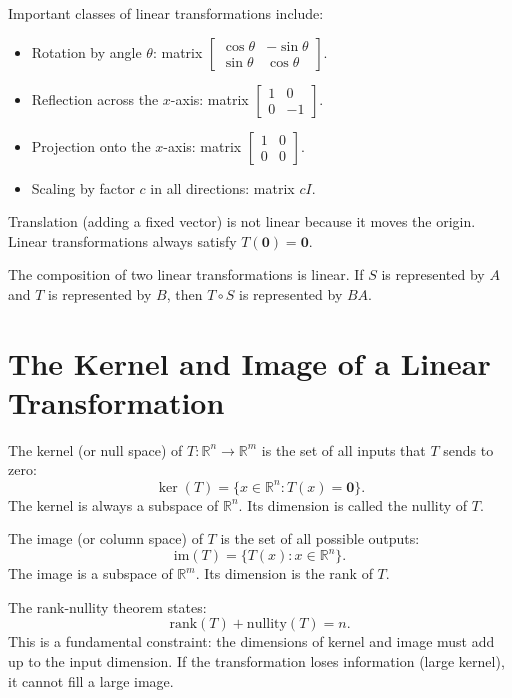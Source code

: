\documentclass[11pt]{article}
\begin{document}
Important classes of linear transformations include:
\begin{itemize}
  \item Rotation by angle $\theta$: matrix $\begin{bmatrix} \cos\theta & -\sin\theta \\ \sin\theta & \cos\theta \end{bmatrix}$.
  \item Reflection across the $x$-axis: matrix $\begin{bmatrix} 1 & 0 \\ 0 & -1 \end{bmatrix}$.
  \item Projection onto the $x$-axis: matrix $\begin{bmatrix} 1 & 0 \\ 0 & 0 \end{bmatrix}$.
  \item Scaling by factor $c$ in all directions: matrix $cI$.
\end{itemize}

Translation (adding a fixed vector) is not linear because it moves the origin. Linear transformations always satisfy $T(\mathbf{0}) = \mathbf{0}$.

The composition of two linear transformations is linear. If $S$ is represented by $A$ and $T$ is represented by $B$, then $T \circ S$ is represented by $BA$.

\section*{The Kernel and Image of a Linear Transformation}

The kernel (or null space) of $T: \mathbb{R}^n \to \mathbb{R}^m$ is the set of all inputs that $T$ sends to zero:
\[
\ker(T) = \{ x \in \mathbb{R}^n : T(x) = \mathbf{0} \}.
\]
The kernel is always a subspace of $\mathbb{R}^n$. Its dimension is called the nullity of $T$.

The image (or column space) of $T$ is the set of all possible outputs:
\[
\text{im}(T) = \{ T(x) : x \in \mathbb{R}^n \}.
\]
The image is a subspace of $\mathbb{R}^m$. Its dimension is the rank of $T$.

The rank-nullity theorem states:
\[
\text{rank}(T) + \text{nullity}(T) = n.
\]
This is a fundamental constraint: the dimensions of kernel and image must add up to the input dimension. If the transformation loses information (large kernel), it cannot fill a large image.
\end{document}
